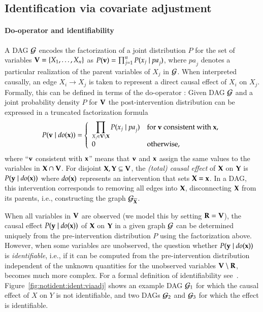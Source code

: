 \subsection{Identification via covariate adjustment} 

\paragraph{Do-operator and identifiability}%
A DAG ${\cal G}$ encodes the factorization of a
joint distribution $P$ for the set of variables ${\bf V}=\{X_1,\ldots,X_n\}$
as $P({\bf v})=\prod_{j=1}^n P(x_j \mid \textit{pa}_j)$, 
where $\textit{pa}_j$ denotes a particular realization of 
the parent variables %
of $X_j$ in ${\cal G}$.
When interpreted causally, an edge $X_i \to X_j$ is 
taken to represent a direct causal effect of $X_i$ on
$X_j$. Formally, this can be defined in terms of the do-operator \cite{Pearl2009}:
Given DAG ${\cal G}$ and a joint probability density $P$ for ${\bf V}$ 
the post-intervention distribution can be expressed
in a truncated factorization formula
\begin{equation}\label{do:truncated:formula}
  P({\bf v} \mid  \textit{do}({\bf x})) = 
  \left\{
    \begin{array}{ll}
    \displaystyle
         \prod_{ X_j \in{\bf V} \setminus {\bf X}} P(x_j \mid  \textit{pa}_j)&
	    \text{for ${\bf v}$ consistent with ${\bf x}$,} \\[1mm]
      0& \text{otherwise,}
    \end{array}
  \right.
\end{equation}
	where ``${\bf v}$ consistent with ${\bf x}$'' means that ${\bf v}$ and ${\bf x}$ assign the same values to the variables in ${\bf X} \cap {\bf V}$.
For disjoint 
${\bf X},{\bf Y}\subseteq {\bf V}$, 
the \emph{(total) causal effect} of ${\bf X}$ on ${\bf Y}$ is
$P({\bf y} \mid  \textit{do}({\bf x}))$ where $\textit{do}({\bf x})$ represents
an intervention that sets ${\bf X}={\bf x}$. 
In a DAG, this intervention corresponds to removing all edges
into ${\bf X}$, disconnecting ${\bf X}$ from its parents, i.e., constructing the graph ${\cal G}_{\overline{{\bf X}}}$. 



When all variables in ${\bf V}$ are observed (we model this by setting ${\bf R}={\bf V}$), 
the causal effect $P({\bf y} \mid  \textit{do}({\bf x}))$ 
of ${\bf X}$ on ${\bf Y}$  in a given graph ${\cal G}$ can be determined uniquely from 
the pre-intervention distribution $P$ using the factorization above.   
However, when some variables are unobserved, the question whether $P({\bf y} \mid  \textit{do}({\bf x}))$  
is  \emph{identifiable}, i.e., if it can be computed from the pre-intervention distribution independent 
of the unknown quantities for the unobserved variables ${\bf V}\setminus {\bf R}$, 
becomes much more complex. 
For a formal definition of identifiability see~\cite[Section 3.2]{Pearl2009}.
Figure~\ref{fig:notident:ident:viaadj} shows an example DAG ${\cal G}_1$ for which 
the causal effect of $X$ on $Y$ is not identifiable, and two DAGs ${\cal G}_2$ and ${\cal G}_3$
for which the effect is identifiable.

